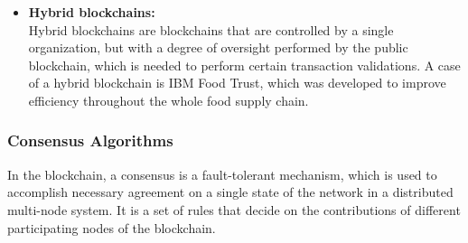 \begin{itemize}
					\item \textbf{Hybrid blockchains:} \\
					Hybrid blockchains are blockchains that are controlled by a single organization, but with a degree of oversight performed by the public blockchain, which is needed to perform certain transaction validations. A case of a hybrid blockchain is IBM Food Trust, which was developed to improve efficiency throughout the whole food supply chain. 
				\end{itemize}
				
				\subsubsection{Consensus Algorithms \cite{shrestha2020new}}
				In the blockchain, a consensus is a fault-tolerant mechanism, which is used to accomplish necessary agreement on a single state of the network in a distributed multi-node system. It is a set of rules that decide on the contributions of different participating nodes of the blockchain. 
